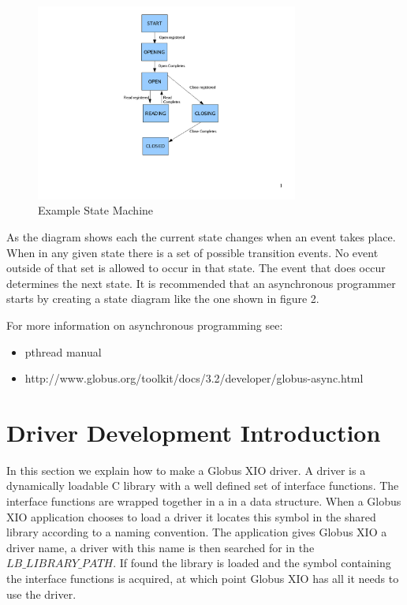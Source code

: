 \documentclass[11pt]{article}
\begin{document}
\begin{figure}
\centerline{\includegraphics[width=3.4in]{figure2}}
\vspace*{-2.0ex}
\caption{Example State Machine}
\label{Example State Machine}
\end{figure}

As the diagram shows each the current state changes when an event takes
place.  When in any given state there is a set of possible transition events.
No event outside of that set is allowed to occur in that state.  The event
that does occur determines the next state.  It is recommended that an
asynchronous programmer starts by creating a state diagram like the one
shown in figure 2.  


For more information on asynchronous programming see:
\begin{itemize}
\item pthread manual
\item http://www.globus.org/toolkit/docs/3.2/developer/globus-async.html
\end{itemize}

\section{Driver Development Introduction}
In this section we explain how to make a Globus XIO driver.  A driver is 
a dynamically loadable C library with a well defined set of interface
functions.  
The interface functions are wrapped together in a in a data structure.
When a Globus XIO application chooses to load a driver it locates this
symbol in the shared library according to a naming convention.
The application gives Globus XIO a driver name, a driver with this name
is then searched for in the $LB\_LIBRARY\_PATH$.  If found the library is
loaded and the symbol containing the interface functions is acquired,
at which point Globus XIO has all it needs to use the driver.
\end{document}
